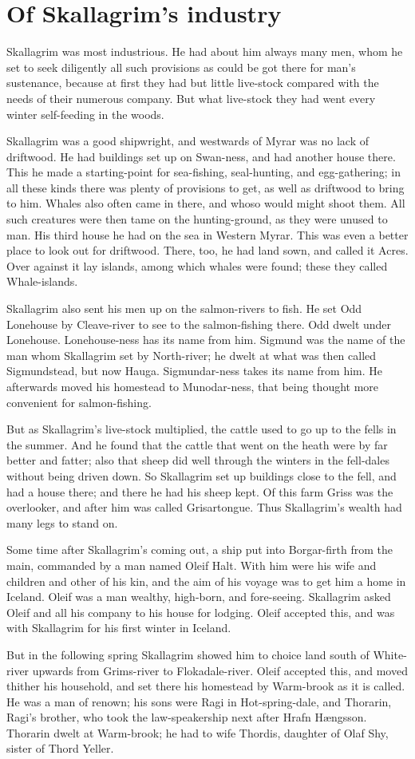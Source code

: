 \chapter{Of Skallagrim's industry}
Skallagrim was most industrious. He had about him always many men, whom he set to seek diligently all such provisions as could be got there for man's sustenance, because at first they had but little live-stock compared with the needs of their numerous company. But what live-stock they had went every winter self-feeding in the woods.

Skallagrim was a good shipwright, and westwards of Myrar was no lack of driftwood. He had buildings set up on Swan-ness, and had another house there. This he made a starting-point for sea-fishing, seal-hunting, and egg-gathering; in all these kinds there was plenty of provisions to get, as well as driftwood to bring to him. Whales also often came in there, and whoso would might shoot them. All such creatures were then tame on the hunting-ground, as they were unused to man. His third house he had on the sea in Western Myrar. This was even a better place to look out for driftwood. There, too, he had land sown, and called it Acres. Over against it lay islands, among which whales were found; these they called Whale-islands.

Skallagrim also sent his men up on the salmon-rivers to fish. He set Odd Lonehouse by Cleave-river to see to the salmon-fishing there. Odd dwelt under Lonehouse. Lonehouse-ness has its name from him. Sigmund was the name of the man whom Skallagrim set by North-river; he dwelt at what was then called Sigmundstead, but now Hauga. Sigmundar-ness takes its name from him. He afterwards moved his homestead to Munodar-ness, that being thought more convenient for salmon-fishing.

But as Skallagrim's live-stock multiplied, the cattle used to go up to the fells in the summer. And he found that the cattle that went on the heath were by far better and fatter; also that sheep did well through the winters in the fell-dales without being driven down. So Skallagrim set up buildings close to the fell, and had a house there; and there he had his sheep kept. Of this farm Griss was the overlooker, and after him was called Grisartongue. Thus Skallagrim's wealth had many legs to stand on.

Some time after Skallagrim's coming out, a ship put into Borgar-firth from the main, commanded by a man named Oleif Halt. With him were his wife and children and other of his kin, and the aim of his voyage was to get him a home in Iceland. Oleif was a man wealthy, high-born, and fore-seeing. Skallagrim asked Oleif and all his company to his house for lodging. Oleif accepted this, and was with Skallagrim for his first winter in Iceland.

But in the following spring Skallagrim showed him to choice land south of White-river upwards from Grims-river to Flokadale-river. Oleif accepted this, and moved thither his household, and set there his homestead by Warm-brook as it is called. He was a man of renown; his sons were Ragi in Hot-spring-dale, and Thorarin, Ragi's brother, who took the law-speakership next after Hrafn H\ae ngsson. Thorarin dwelt at Warm-brook; he had to wife Thordis, daughter of Olaf Shy, sister of Thord Yeller.
